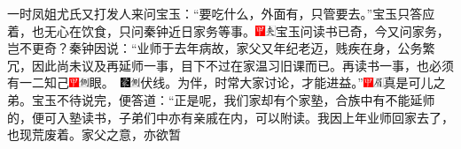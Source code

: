 一时凤姐尤氏又打发人来问宝玉：“要吃什么，外面有，只管要去。”宝玉只答应着，也无心在饮食，只问秦钟近日家务等事。{\includegraphics[width=3mm]{../Images/00002}\includegraphics[width=3mm]{../Images/00012}\footnotesize \kaishu 宝玉问读书已奇，今又问家务，岂不更奇？}秦钟因说：“业师于去年病故，家父又年纪老迈，贱疾在身，公务繁冗，因此尚未议及再延师一事，目下不过在家温习旧课而已。再读书一事，也必须有一二知己{{\includegraphics[width=3mm]{../Images/00002}\includegraphics[width=3mm]{../Images/00011}\footnotesize \kaishu 眼。　}\includegraphics[width=3mm]{../Images/00006}\includegraphics[width=3mm]{../Images/00011}\footnotesize \kaishu 伏线。}为伴，时常大家讨论，才能进益。”{\includegraphics[width=3mm]{../Images/00002}\includegraphics[width=3mm]{../Images/00010}\footnotesize \kaishu 真是可儿之弟。}宝玉不待说完，便答道：“正是呢，我们家却有个家塾，合族中有不能延师的，便可入塾读书，子弟们中亦有亲戚在内，可以附读。我因上年业师回家去了，也现荒废着。家父之意，亦欲暂